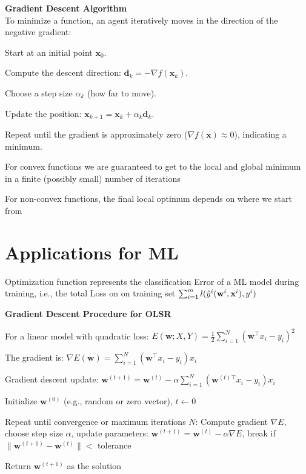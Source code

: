 \vspace{0.5em}
\textbf{Gradient Descent Algorithm}\\
To minimize a function, an agent iteratively moves in the direction of the negative gradient:

\begin{tightitemize}
    \item Start at an initial point $\mathbf{x}_0$.
    \item Compute the descent direction: $\mathbf{d}_k = -\nabla f(\mathbf{x}_k)$.
    \item Choose a step size $\alpha_k$ (how far to move).
    \item Update the position: $\mathbf{x}_{k+1} = \mathbf{x}_k + \alpha_k \mathbf{d}_k$.
    \item Repeat until the gradient is approximately zero ($\nabla f(\mathbf{x}) \approx 0$), indicating a minimum.
\end{tightitemize}

For convex functions we are guaranteed to get to the local and global minimum 
in a finite (possibly small) number of iterations

For non-convex functions, the final local optimum depends on where we start from

\section*{Applications for ML}

Optimization function represents the classification Error of a ML model during training,
i.e., the total Loss on on training set 
$
\sum_{i=1}^{m}l(\hat{y}^i(\mathbf{w}^i, \mathbf{x}^i), y^i)
$

\textbf{Gradient Descent Procedure for OLSR}

For a linear model with quadratic loss:
$
E(\mathbf{w}; X, Y) = \frac{1}{2} \sum_{i=1}^N (\mathbf{w}^\top x_i - y_i)^2
$

The gradient is:
$
\nabla E(\mathbf{w}) = \sum_{i=1}^N (\mathbf{w}^\top x_i - y_i)x_i
$

Gradient descent update:
$
\mathbf{w}^{(t+1)} = \mathbf{w}^{(t)} - \alpha \sum_{i=1}^N (\mathbf{w}^{(t)\top} x_i - y_i)x_i
$

\begin{tightitemize}
    \item Initialize $\mathbf{w}^{(0)}$ (e.g., random or zero vector), $t \gets 0$
    \item Repeat until convergence or maximum iterations $N$:
          Compute gradient $\nabla E$, choose step size $\alpha$, update parameters:  
          $\mathbf{w}^{(t+1)} = \mathbf{w}^{(t)} - \alpha \nabla E$,  
          break if $\|\mathbf{w}^{(t+1)} - \mathbf{w}^{(t)}\| <$ tolerance
    \item Return $\mathbf{w}^{(t+1)}$ as the solution
\end{tightitemize}


